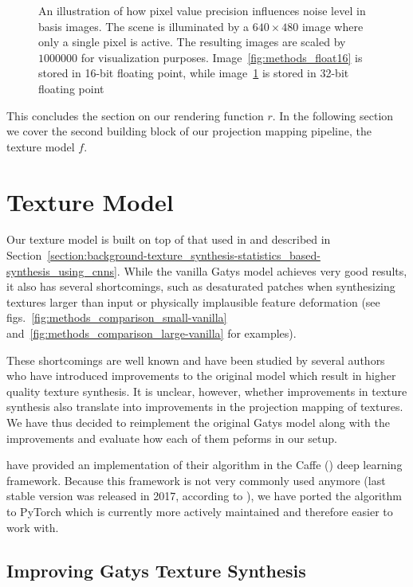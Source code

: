 \begin{figure}[]
\begin{subfigure}[b]{0.48\textwidth}
        \caption{}
        \label{fig:methods_float32}
    \end{subfigure}
    \caption{An illustration of how pixel value precision influences noise level in basis images. The scene is illuminated by a \(640 \times 480\) image where only a single pixel is active. The resulting images are scaled by \(1000000\) for visualization purposes. Image~\ref{fig:methods_float16} is stored in 16-bit floating point, while image~\ref{fig:methods_float32} is stored in 32-bit floating point}
    \label{fig:methods_float}
\end{figure}

This concludes the section on our rendering function \(r\). In the following section we cover the second building block of our projection mapping pipeline, the texture model \(f\).

\section{Texture Model}
\label{section:methods-texture_model}

Our texture model is built on top of that used in \citet{Gatys2015} and described in Section~\ref{section:background-texture_synthesis-statistics_based-synthesis_using_cnns}. While the vanilla Gatys model achieves very good results, it also has several shortcomings, such as desaturated patches when synthesizing textures larger than input or physically implausible feature deformation (see figs.~\ref{fig:methods_comparison_small-vanilla} and~\ref{fig:methods_comparison_large-vanilla} for examples).

These shortcomings are well known and have been studied by several authors who have introduced improvements to the original model which result in higher quality texture synthesis. It is unclear, however, whether improvements in texture synthesis also translate into improvements in the projection mapping of textures. We have thus decided to reimplement the original Gatys model along with the improvements and evaluate how each of them peforms in our setup.

\citet{Gatys2015} have provided an implementation of their algorithm in the Caffe (\citet{Jia2014}) deep learning framework. Because this framework is not very commonly used anymore (last stable version was released in 2017, according to \citet{CaffeGitHub}), we have ported the algorithm to PyTorch which is currently more actively maintained and therefore easier to work with.

\subsection{Improving Gatys Texture Synthesis}
\label{section:methods-texture_model-improvements}

